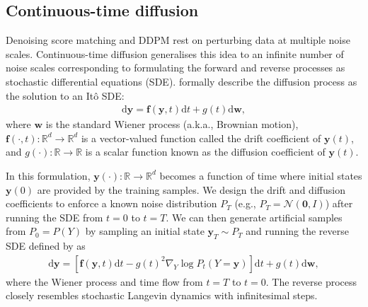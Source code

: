 \subsection{Continuous-time diffusion} \label{ch2C:Sec:continuous_diffusion}
Denoising score matching and DDPM rest on perturbing data at multiple noise scales. Continuous-time diffusion generalises this idea to an infinite number of noise scales corresponding to formulating the forward and reverse processes as stochastic differential equations (SDE). \citet{song2020score} formally describe the diffusion process as the solution to an It{\^o} SDE:
\begin{align}
  \text{d}\bm{y} = \bm{f}(\bm{y}, t) \text{d}t + g(t) \text{d}\bm{w}, \label{eq:continuous_diffusion}
\end{align}
where $\bm{w}$ is the standard Wiener process (a.k.a., Brownian motion), $\bm{f}(\cdot, t): \mathbb{R}^d \rightarrow \mathbb{R}^d$ is a vector-valued function called the drift coefficient of $\bm{y}(t)$, and $g(\cdot): \mathbb{R} \rightarrow \mathbb{R}$ is a scalar function known as
the diffusion coefficient of $\bm{y}(t)$.

In this formulation, $\bm{y}(\cdot): \mathbb{R} \rightarrow \mathbb{R}^d$ becomes a function of time where initial states $\bm{y}(0)$ are provided by the training samples. We design the drift and diffusion coefficients to enforce a known noise distribution $P_T$ (e.g., $P_T = \mathcal{N}(\bm 0, I)$) after running the SDE from $t=0$ to $t=T$. We can then generate artificial samples from $P_0 = P(Y)$ by sampling an initial state $\bm{y}_T \sim P_T$ and running the reverse SDE defined by \citet{anderson1982reverse} as
\begin{align}
  \text{d}\bm{y} = \left[ \bm{f}(\bm{y}, t) \text{d}t - g(t)^2 \nabla_Y \log P_t(Y=\bm{y}) \right] \text{d}t + g(t) \text{d}\bm{w},\label{eq:continuous_reverse_diffusion}
\end{align}
where the Wiener process and time flow from $t=T$ to $t=0$. The reverse process closely resembles stochastic Langevin dynamics with infinitesimal steps.

